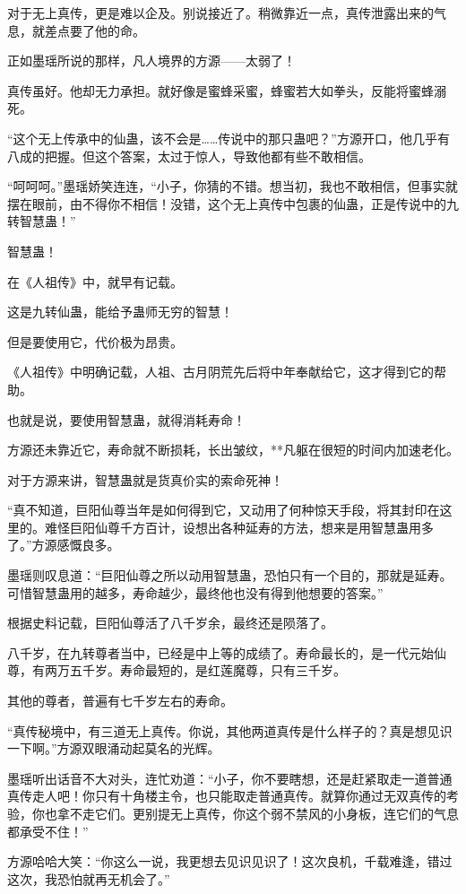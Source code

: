 \begin{this_body}
对于无上真传，更是难以企及。别说接近了。稍微靠近一点，真传泄露出来的气息，就差点要了他的命。

正如墨瑶所说的那样，凡人境界的方源——太弱了！

真传虽好。他却无力承担。就好像是蜜蜂采蜜，蜂蜜若大如拳头，反能将蜜蜂溺死。

“这个无上传承中的仙蛊，该不会是……传说中的那只蛊吧？”方源开口，他几乎有八成的把握。但这个答案，太过于惊人，导致他都有些不敢相信。

“呵呵呵。”墨瑶娇笑连连，“小子，你猜的不错。想当初，我也不敢相信，但事实就摆在眼前，由不得你不相信！没错，这个无上真传中包裹的仙蛊，正是传说中的九转智慧蛊！”

智慧蛊！

在《人祖传》中，就早有记载。

这是九转仙蛊，能给予蛊师无穷的智慧！

但是要使用它，代价极为昂贵。

《人祖传》中明确记载，人祖、古月阴荒先后将中年奉献给它，这才得到它的帮助。

也就是说，要使用智慧蛊，就得消耗寿命！

方源还未靠近它，寿命就不断损耗，长出皱纹，**凡躯在很短的时间内加速老化。

对于方源来讲，智慧蛊就是货真价实的索命死神！

“真不知道，巨阳仙尊当年是如何得到它，又动用了何种惊天手段，将其封印在这里的。难怪巨阳仙尊千方百计，设想出各种延寿的方法，想来是用智慧蛊用多了。”方源感慨良多。

墨瑶则叹息道：“巨阳仙尊之所以动用智慧蛊，恐怕只有一个目的，那就是延寿。可惜智慧蛊用的越多，寿命越少，最终他也没有得到他想要的答案。”

根据史料记载，巨阳仙尊活了八千岁余，最终还是陨落了。

八千岁，在九转尊者当中，已经是中上等的成绩了。寿命最长的，是一代元始仙尊，有两万五千岁。寿命最短的，是红莲魔尊，只有三千岁。

其他的尊者，普遍有七千岁左右的寿命。

“真传秘境中，有三道无上真传。你说，其他两道真传是什么样子的？真是想见识一下啊。”方源双眼涌动起莫名的光辉。

墨瑶听出话音不大对头，连忙劝道：“小子，你不要瞎想，还是赶紧取走一道普通真传走人吧！你只有十角楼主令，也只能取走普通真传。就算你通过无双真传的考验，你也拿不走它们。更别提无上真传，你这个弱不禁风的小身板，连它们的气息都承受不住！”

方源哈哈大笑：“你这么一说，我更想去见识见识了！这次良机，千载难逢，错过这次，我恐怕就再无机会了。”


\end{this_body}
